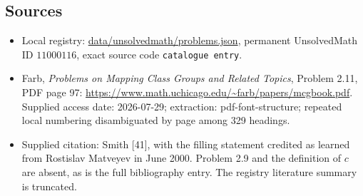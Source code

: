 \documentclass[11pt]{article}
\begin{document}
\subsection{Sources}
\begin{itemize}
\item Local registry: \url{data/unsolvedmath/problems.json}, permanent UnsolvedMath ID $11000116$, exact source code \texttt{catalogue entry}.
\item Farb, \emph{Problems on Mapping Class Groups and Related Topics}, Problem 2.11, PDF page 97: \url{https://www.math.uchicago.edu/~farb/papers/mcgbook.pdf}. Supplied access date: 2026-07-29; extraction: pdf-font-structure; repeated local numbering disambiguated by page among 329 headings.
\item Supplied citation: Smith [41], with the filling statement credited as learned from Rostislav Matveyev in June 2000. Problem 2.9 and the definition of $c$ are absent, as is the full bibliography entry. The registry literature summary is truncated.
\end{itemize}
\end{document}
